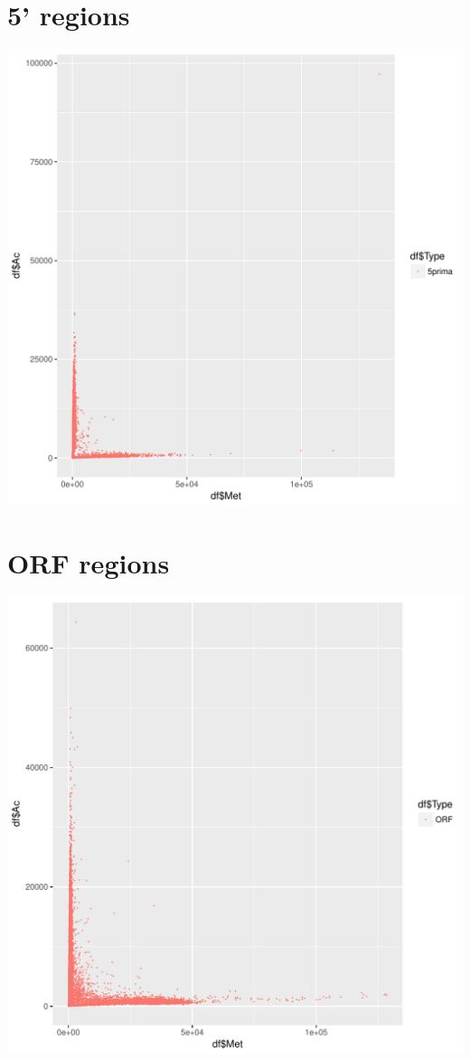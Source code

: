 \documentclass{article}\usepackage[]{graphicx}\usepackage[]{color}
\makeatletter
\def\maxwidth{ %
  \ifdim\Gin@nat@width>\linewidth
    \linewidth
  \else
    \Gin@nat@width
  \fi
}
\newenvironment{knitrout}{}{} %
\makeatother
\begin{document}
\section{5' regions}
\begin{knitrout}
\color{fgcolor}
\includegraphics[width=\maxwidth]{figure/plot_5-1} 

\end{knitrout}
\clearpage
\section{ORF regions}
\begin{knitrout}
\color{fgcolor}
\includegraphics[width=\maxwidth]{figure/plot_ORF-1} 

\end{knitrout}
\clearpage
\end{document}
